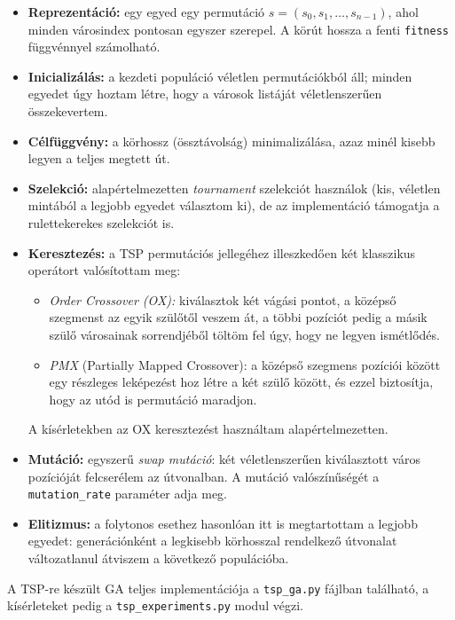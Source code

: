 \documentclass[a4paper,12pt]{article}
\begin{document}
\begin{itemize}
  \item \textbf{Reprezentáció:} egy egyed egy permutáció
        $s = (s_0, s_1, \dots, s_{n-1})$, ahol minden városindex pontosan
        egyszer szerepel. A körút hossza a fenti \texttt{fitness} függvénnyel
        számolható.
  \item \textbf{Inicializálás:} a kezdeti populáció véletlen permutációkból
        áll; minden egyedet úgy hoztam létre, hogy a városok listáját
        véletlenszerűen összekevertem.
  \item \textbf{Célfüggvény:} a körhossz (össztávolság) minimalizálása,
        azaz minél kisebb legyen a teljes megtett út.
  \item \textbf{Szelekció:} alapértelmezetten \emph{tournament} szelekciót
        használok (kis, véletlen mintából a legjobb egyedet választom ki),
        de az implementáció támogatja a rulettekerekes szelekciót is.
  \item \textbf{Keresztezés:} a TSP permutációs jellegéhez illeszkedően
        két klasszikus operátort valósítottam meg:
        \begin{itemize}
          \item \emph{Order Crossover (OX):} kiválasztok két vágási pontot,
                a középső szegmenst az egyik szülőtől veszem át, a többi
                pozíciót pedig a másik szülő városainak sorrendjéből töltöm fel
                úgy, hogy ne legyen ismétlődés.
          \item \emph{PMX} (Partially Mapped Crossover): a középső szegmens
                pozíciói között egy részleges leképezést hoz létre a két szülő
                között, és ezzel biztosítja, hogy az utód is permutáció maradjon.
        \end{itemize}
        A kísérletekben az OX keresztezést használtam alapértelmezetten.
  \item \textbf{Mutáció:} egyszerű \emph{swap mutáció}: két véletlenszerűen
        kiválasztott város pozícióját felcserélem az útvonalban. A mutáció
        valószínűségét a \texttt{mutation\_rate} paraméter adja meg.
  \item \textbf{Elitizmus:} a folytonos esethez hasonlóan itt is megtartottam
        a legjobb egyedet: generációnként a legkisebb körhosszal rendelkező
        útvonalat változatlanul átviszem a következő populációba.
\end{itemize}

A TSP-re készült GA teljes implementációja a \texttt{tsp\_ga.py} fájlban
található, a kísérleteket pedig a \texttt{tsp\_experiments.py} modul
végzi.
\end{document}
